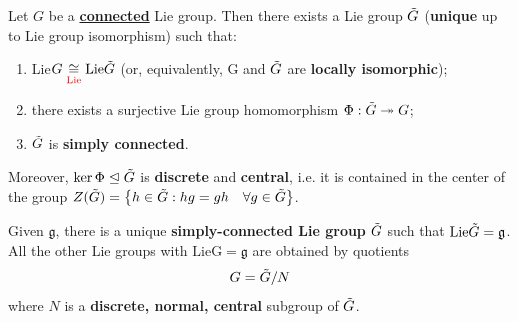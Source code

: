 \documentclass[../main.tex]{subfiles}
\begin{document}
\begin{theorem}
Let $G$ be a \underline{\textbf{connected}} Lie group. Then there exists a Lie group $\Tilde{G}$ (\textbf{unique} up to Lie group isomorphism) such that:
\begin{enumerate}
    \item Lie$G\underset{{\color{red}\text{Lie}}}{\cong}\textrm{Lie}\Tilde{G}$ (or, equivalently, G and $\Tilde{G}$ are \textbf{locally isomorphic});
    \item there exists a surjective Lie group homomorphism $\Phi:\Tilde{G}\twoheadrightarrow G$;
    \item $\Tilde{G}$ is \textbf{simply connected}.
\end{enumerate}
Moreover, $\ker\Phi\trianglelefteq\Tilde{G}$ is \textbf{discrete} and \textbf{central}, i.e. it is contained in the center of the group $Z(\Tilde{G})=\left\{h\in\Tilde{G}: hg=gh \quad \forall g\in\Tilde{G}\right\}$.
\end{theorem}
\begin{kaobox}[frametitle=Remark]
Given $\mathfrak{g}$, there is a unique \textbf{simply-connected Lie group} $\Tilde{G}$ such that $\textrm{Lie}\Tilde{G}=\mathfrak{g}$. All the other Lie groups with $\textrm{Lie}\textrm{G}=\mathfrak{g}$ are obtained by quotients 
\[
G=\Tilde{G}/N
\]
where $N$ is a \textbf{discrete, normal, central} subgroup of $\Tilde{G}$. 
\end{kaobox}
\end{document}
